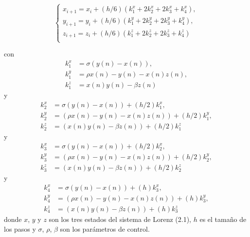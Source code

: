 \begin{equation}
  \left\lbrace
  \begin{array}{l}
   	x_{i+1}=x_{i}+(h/6)(k^{x}_{1}+2k^{x}_{2}+2k^{x}_{3}+k^{x}_{4}), \\
   	y_{i+1}=y_{i}+(h/6)(k^{y}_{1}+2k^{y}_{2}+2k^{y}_{3}+k^{y}_{4}), \\
   	z_{i+1}=z_{i}+(h/6)(k^{z}_{1}+2k^{z}_{2}+2k^{z}_{3}+k^{z}_{4}) \\
  \end{array}
  \right.
\end{equation}


con
\begin{subequations}
\begin{align}
k^{x}_{1}&=\sigma(y(n)-x(n)), \\
k^{y}_{1}&=\rho x(n)-y(n)-x(n)z(n), \\
k^{z}_{1}&=x(n)y(n)-\beta z(n)  
\end{align}
\end{subequations}
y
\begin{subequations}
\begin{align}
k^{x}_{2}&=\sigma(y(n)-x(n)) + (h/2)k^{x}_{1}, \\
k^{y}_{2}&=(\rho x(n)-y(n)-x(n)z(n)) + (h/2)k^{y}_{1},  \\
k^{z}_{2}&=(x(n)y(n)-\beta z(n)) + (h/2)k^{z}_{1}
\end{align}
\end{subequations}
y
\begin{subequations}
\begin{align}
k^{x}_{3}&=\sigma(y(n)-x(n)) + (h/2)k^{x}_{2}, \\
k^{y}_{3}&=(\rho x(n)-y(n)-x(n)z(n)) + (h/2)k^{y}_{2},  \\
k^{z}_{3}&=(x(n)y(n)-\beta z(n)) + (h/2)k^{z}_{2} 
\end{align}
\end{subequations}
y
\begin{subequations}
\begin{align}
k^{x}_{4} &= \sigma(y(n)-x(n)) + (h)k^{x}_{3},  \\
k^{y}_{4} &= (\rho x(n)-y(n)-x(n)z(n)) + (h)k^{y}_{3},  \\
k^{z}_{4} &= (x(n)y(n)-\beta z(n)) + (h)k^{z}_{3} 
\end{align}
\end{subequations}
donde $x$, $y$ y $z$ son los tres estados del sistema de Lorenz (2.1), $h$ es el tamaño de los pasos y $\sigma$, $\rho$, $\beta$ son los parámetros de control. \\

